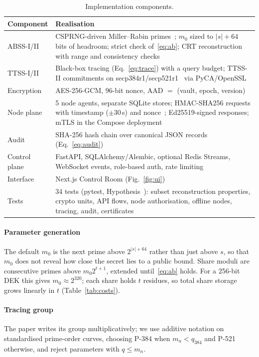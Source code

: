 \documentclass[conference]{IEEEtran}
\begin{document}
\begin{table}[t]
\centering
\caption{Implementation components.}
\label{tab:impl}
\setlength{\tabcolsep}{4pt}
\begin{tabular}{@{}p{}p{}@{}}
\toprule
Component & Realisation \\
\midrule
ABSS-I/II & CSPRNG-driven Miller--Rabin primes~\cite{rabin1980primality}; $m_0$ sized to $|s|+64$ bits of headroom; strict check of~\eqref{eq:ab}; CRT reconstruction with range and consistency checks \\
TTSS-I/II & Black-box tracing (Eq.~\eqref{eq:trace}) with a query budget; TTSS-II commitments on secp384r1/secp521r1~\cite{sec2v2} via PyCA/OpenSSL \\
Encryption & AES-256-GCM, 96-bit nonce, AAD $=$ (vault, epoch, version)~\cite{dworkin2007gcm} \\
Node plane & 5 node agents, separate SQLite stores; HMAC-SHA256 requests with timestamp ($\pm30$\,s) and nonce~\cite{rfc2104}; Ed25519-signed responses; mTLS in the Compose deployment \\
Audit & SHA-256 hash chain over canonical JSON records (Eq.~\eqref{eq:audit})~\cite{schneier1999audit,crosby2009tamper} \\
Control plane & FastAPI, SQLAlchemy/Alembic, optional Redis Streams, WebSocket events, role-based auth, rate limiting \\
Interface & Next.js Control Room (Fig.~\ref{fig:ui}) \\
Tests & 34 tests (pytest, Hypothesis~\cite{maciver2019hypothesis}): subset reconstruction properties, crypto units, API flows, node authorisation, offline nodes, tracing, audit, certificates \\
\bottomrule
\end{tabular}
\end{table}

\paragraph*{Parameter generation} The default $m_0$ is the next prime above $2^{|s|+64}$ rather than just above $s$, so that $m_0$ does not reveal how close the secret lies to a public bound. Share moduli are consecutive primes above $m_0 2^{t+1}$, extended until~\eqref{eq:ab} holds. For a 256-bit DEK this gives $m_0\approx 2^{320}$; each share holds $t$ residues, so total share storage grows linearly in $t$ (Table~\ref{tab:costs}).

\paragraph*{Tracing group} The paper writes its group multiplicatively; we use additive notation on standardised prime-order curves, choosing P-384 when $m_n<q_{384}$ and P-521 otherwise, and reject parameters with $q \le m_n$.
\end{document}
